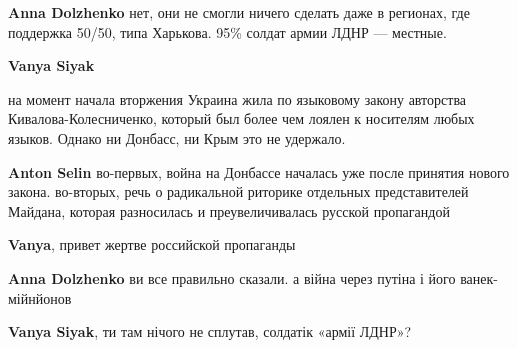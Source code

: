 \begin{itemize}
\begin{itemize}
\textbf{Anna Dolzhenko} нет, они не смогли ничего сделать даже в регионах, где поддержка 50/50, типа Харькова.
95\% солдат армии ЛДНР — местные.

 
\textbf{Vanya Siyak} 

на момент начала вторжения Украина жила по языковому закону авторства
Кивалова-Колесниченко, который был более чем лоялен к носителям любых языков.
Однако ни Донбасс, ни Крым это не удержало.

 
\textbf{Anton Selin} во-первых, война на Донбассе началась уже после принятия нового закона. во-вторых, речь о радикальной риторике отдельных представителей Майдана, которая разносилась и преувеличивалась русской пропагандой

 
\textbf{Vanya}, привет жертве российской пропаганды 👋

 
\textbf{Anna Dolzhenko} ви все правильно сказали. а війна через путіна і його ванек-мійнйонов

 
\textbf{Vanya Siyak}, ти там нічого не сплутав, солдатік «армії ЛДНР»?

 

\end{itemize}
\end{itemize}
